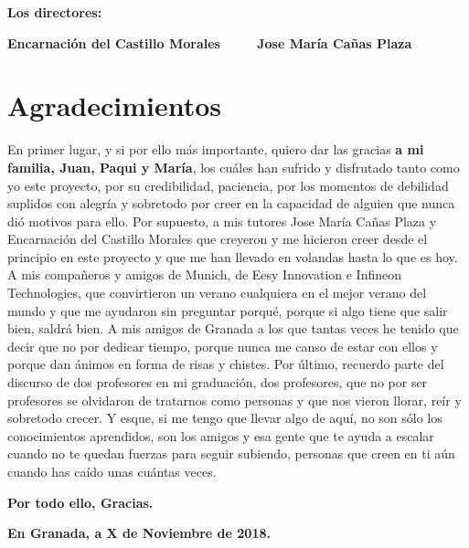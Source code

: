 \vspace{1cm}

\textbf{Los directores:}

\vspace{5cm}

\noindent \textbf{Encarnación del Castillo Morales\ \ \ \ \ Jose María Cañas Plaza}

\chapter*{Agradecimientos}
\thispagestyle{empty}

       \vspace{1cm}

En primer lugar, y si por ello más importante, quiero dar las gracias {\bf a mi familia, Juan, Paqui y María}, los cuáles han sufrido y disfrutado tanto como yo este proyecto, por su credibilidad, paciencia, por los momentos de debilidad suplidos con alegría y sobretodo por creer en la capacidad de alguien que nunca dió motivos para ello.  \newline
Por supuesto, a mis tutores Jose María Cañas Plaza y Encarnación del Castillo Morales que creyeron y me hicieron creer desde el principio en este proyecto y que me han llevado en volandas hasta lo que es hoy. \newline
A mis compañeros y amigos de Munich, de Eesy Innovation e Infineon Technologies, que convirtieron un verano cualquiera en el mejor verano del mundo y que me ayudaron sin preguntar porqué, porque si algo tiene que salir bien, saldrá bien. \newline 
A mis amigos de Granada a los que tantas veces he tenido que decir que no por dedicar tiempo, porque nunca me canso de estar con ellos y porque dan ánimos en forma de risas y chistes.\newline
Por último, recuerdo parte del discurso de dos profesores en mi graduación, dos profesores, que no por ser profesores se olvidaron de tratarnos como personas y que nos vieron llorar, reír y sobretodo crecer. Y esque, si me tengo que llevar algo de aquí, no son sólo los conocimientos aprendidos, son los amigos y esa gente que te ayuda a escalar cuando no te quedan fuerzas para seguir subiendo, personas que creen en ti aún cuando has caído unas cuántas veces.

{\bf Por todo ello, Gracias.}

\vspace{1cm}

{\bf En Granada, a X de Noviembre de 2018.}

